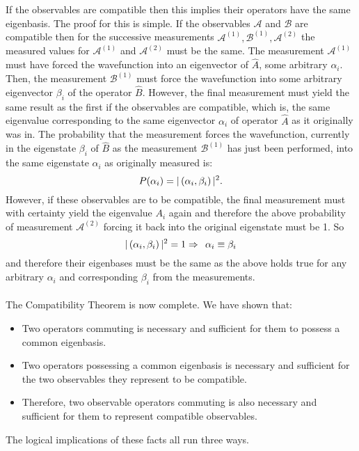 \\\\
If the observables are compatible then this implies their operators have the same eigenbasis. The proof for this is simple. If the observables $\mathcal{A}$ and $\mathcal{B}$ are compatible then for the successive measurements $\mathcal{A}^{(1)},\mathcal{B}^{(1)},\mathcal{A}^{(2)}$ the measured values for $\mathcal{A}^{(1)}$ and $\mathcal{A}^{(2)}$ must be the same. The measurement $\mathcal{A}^{(1)}$ must have forced the wavefunction into an eigenvector of $\hat{A}$, some arbitrary $\alpha_{i}$. Then, the measurement $\mathcal{B}^{(1)}$ must force the wavefunction into some arbitrary eigenvector $\beta_{i}$ of the operator $\hat{B}$. However, the final measurement must yield the same result as the first if the observables are compatible, which is, the same eigenvalue corresponding to the same eigenvector $\alpha_{i}$ of operator $\hat{A}$ as it originally was in. The probability that the measurement forces the wavefunction, currently in the eigenstate $\beta_{i}$ of $\hat{B}$ as the measurement $\mathcal{B}^{(1)}$ has just been performed, into the same eigenstate $\alpha_{i}$ as originally measured is:
$$
P(\alpha_{i})=|\left(\alpha_{i},\beta_{i}\right)|^2.
$$
However, if these observables are to be compatible, the final measurement must with certainty yield the eigenvalue $A_{i}$ again and therefore the above probability of measurement $\mathcal{A}^{(2)}$ forcing it back into the original eigenstate must be 1. So 
$$
|\left(\alpha_{i},\beta_{i}\right)|^2=1 \Rightarrow\:\: \alpha_{i}\equiv\beta_{i}
$$
and therefore their eigenbases must be the same as the above holds true for any arbitrary $\alpha_{i}$ and corresponding $\beta_{i}$ from the measurements.
\\\\
The Compatibility Theorem is now complete. We have shown that:
\begin{itemize}
    \item Two operators commuting is necessary and sufficient for them to possess a common eigenbasis.
    \item Two operators possessing a common eigenbasis is necessary and sufficient for the two observables they represent to be compatible.
    \item Therefore, two observable operators commuting is also necessary and sufficient for them to represent compatible observables.
\end{itemize}
The logical implications of these facts all run three ways.
\\\\
